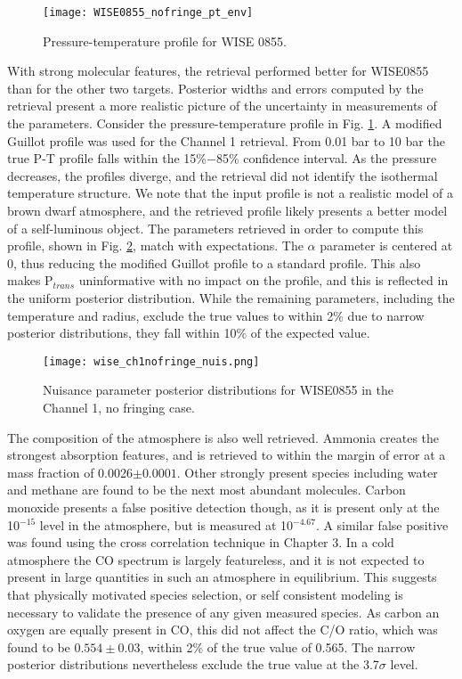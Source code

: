 \begin{figure}[t]
	\texttt{[image: WISE0855\_nofringe\_pt\_env]}
	\caption{Pressure-temperature profile for WISE 0855.}
	\label{fig:presWISE}
\end{figure}
With strong molecular features, the retrieval performed better for WISE0855 than for the other two targets.
Posterior widths and errors computed by the retrieval present a more realistic picture of the uncertainty in measurements of the parameters.
Consider the pressure-temperature profile in Fig. \ref{fig:presWISE}.
A modified Guillot profile was used for the Channel 1 retrieval.
From 0.01 bar to 10 bar the true P-T profile falls within the 15\%$-$85\% confidence interval.
As the pressure decreases, the profiles diverge, and the retrieval did not identify the isothermal temperature structure.
We note that the input profile is not a realistic model of a brown dwarf atmosphere, and the retrieved profile likely presents a better model of a self-luminous object.
The parameters retrieved in order to compute this profile, shown in Fig. \ref{fig:postWISEnuis}, match with expectations.
The $\alpha$ parameter is centered at $0$, thus reducing the modified Guillot profile to a standard profile.
This also makes P$_{trans}$ uninformative with no impact on the profile, and this is reflected in the uniform posterior distribution.
While the remaining parameters, including the temperature and radius, exclude the true values to within 2\% due to narrow posterior distributions, they fall within 10\% of the expected value.

\begin{figure}[h]
	\texttt{[image: wise\_ch1nofringe\_nuis.png]}
	\caption{Nuisance parameter posterior distributions for WISE0855 in the Channel 1, no fringing case.}
	\label{fig:postWISEnuis}
\end{figure}

The composition of the atmosphere is also well retrieved.
Ammonia creates the strongest absorption features, and is retrieved to within the margin of error at a mass fraction of 0.0026$\pm0.0001$.
Other strongly present species including water and methane are found to be the next most abundant molecules.
Carbon monoxide presents a false positive detection though, as it is present only at the 10$^{-15}$ level in the atmosphere, but is measured at 10$^{-4.67}$.
A similar false positive was found using the cross correlation technique in Chapter 3.
In a cold atmosphere the CO spectrum is largely featureless, and it is not expected to present in large quantities in such an atmosphere in equilibrium.
This suggests that physically motivated species selection, or self consistent modeling is necessary to validate the presence of any given measured species.
As carbon an oxygen are equally present in CO, this did not affect the C/O ratio, which was found to be $0.554\pm0.03$, within 2\% of the true value of 0.565.
The narrow posterior distributions nevertheless exclude the true value at the 3.7$\sigma$ level.

